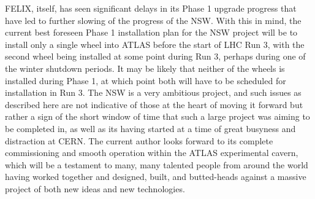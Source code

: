FELIX, itself, has seen significant delays in its Phase 1 upgrade progress that have led to 
further slowing of the progress of the NSW.
With this in mind, the current best foreseen Phase 1 installation plan for the NSW project will be to install only a single wheel
into ATLAS before the start of LHC Run 3, with the second wheel being installed at some point
during Run 3, perhaps during one of the winter shutdown periods.
It may be likely that neither of the wheels is installed during Phase 1, at which point both will have to be scheduled
for installation in Run 3.
The NSW is a very ambitious project, and such issues as described here are not indicative of those
at the heart of moving it forward but rather a sign of the short window of time that such a large project
was aiming to be completed in, as well as its having started at a time of great busyness and distraction
at CERN.
The current author looks forward to its complete commissioning and smooth operation within the ATLAS experimental cavern,
which will be a testament to many, many talented people from around the world having worked together
and designed, built, and butted-heads against a massive project of both new ideas and new technologies.


%
%

